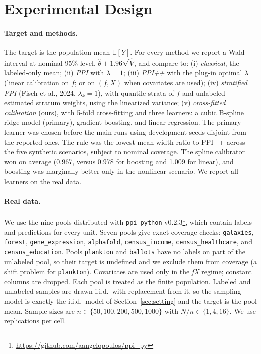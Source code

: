 \section{Experimental Design}
\label{sec:exp}

\paragraph{Target and methods.}
The target is the population mean $\mathbb E[Y]$. For every method we report a Wald interval at nominal 95\% level, $\hat\theta\pm1.96\sqrt{\widehat V}$, and compare to:
(i) \emph{classical}, the labeled-only mean;
(ii) \emph{PPI} with $\lambda=1$;
(iii) \emph{PPI++} with the plug-in optimal $\lambda$ (linear calibration on $f$; or on $(f,X)$ when covariates are used);
(iv) \emph{stratified PPI} (Fisch et al., 2024, $\lambda_k=1$), with quantile strata of $f$ and unlabeled-estimated stratum weights, using the linearized variance;
(v) \emph{cross-fitted calibration} (ours), with 5-fold cross-fitting and three learners: a cubic B-spline ridge model (primary), gradient boosting, and linear regression.
The primary learner was chosen before the main runs using development seeds disjoint from the reported ones. The rule was the lowest mean width ratio to PPI++ across the five synthetic scenarios, subject to nominal coverage. The spline calibrator won on average (0.967, versus 0.978 for boosting and 1.009 for linear), and boosting was marginally better only in the nonlinear scenario. We report all learners on the real data.

\paragraph{Real data.}
We use the nine pools distributed with \texttt{ppi-python} v0.2.3\footnote{\url{https://github.com/aangelopoulos/ppi_py}}, which contain labels and predictions for every unit. Seven pools give exact coverage checks: \texttt{galaxies}, \texttt{forest}, \texttt{gene\_expression}, \texttt{alphafold}, \texttt{census\_income}, \texttt{census\_healthcare}, and \texttt{census\_education}. Pools \texttt{plankton} and \texttt{ballots} have no labels on part of the unlabeled pool, so their target is undefined and we exclude them from coverage (a shift problem for \texttt{plankton}). Covariates are used only in the \emph{fX} regime; constant columns are dropped. Each pool is treated as the finite population. Labeled and unlabeled samples are drawn i.i.d.\ with replacement from it, so the sampling model is exactly the i.i.d.\ model of Section~\ref{sec:setting} and the target is the pool mean. Sample sizes are $n\in\{50,100,200,500,1000\}$ with $N/n\in\{1,4,16\}$. We use \REPSREAL{} replications per cell.

